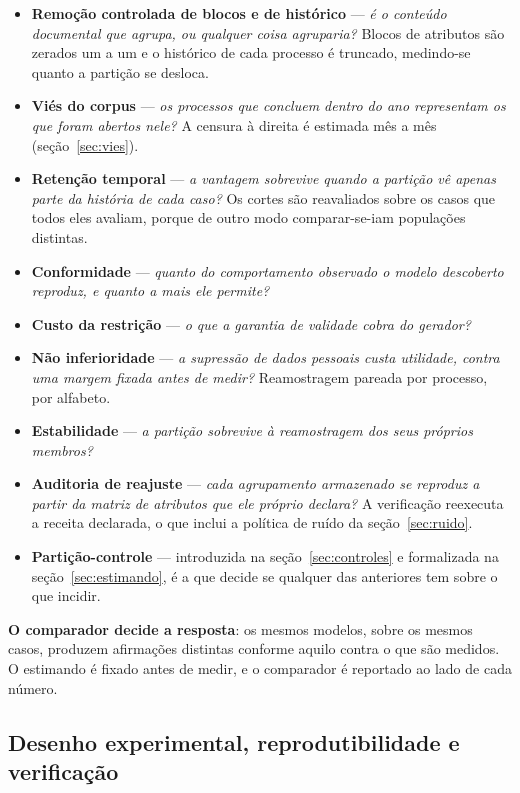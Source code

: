 \begin{itemize}
  \item \textbf{Remoção controlada de blocos e de histórico} --- \emph{é o conteúdo documental que agrupa, ou
    qualquer coisa agruparia?} Blocos de atributos são zerados um a um e o histórico de cada
    processo é truncado, medindo-se quanto a partição se desloca.
  \item \textbf{Viés do corpus} --- \emph{os processos que concluem dentro do ano representam os
    que foram abertos nele?} A censura à direita é estimada mês a mês (seção~\ref{sec:vies}).
  \item \textbf{Retenção temporal} --- \emph{a vantagem sobrevive quando a partição vê apenas parte
    da história de cada caso?} Os cortes são reavaliados sobre os casos que todos eles avaliam,
    porque de outro modo comparar-se-iam populações distintas.
  \item \textbf{Conformidade} --- \emph{quanto do comportamento observado o modelo descoberto
    reproduz, e quanto a mais ele permite?}
  \item \textbf{Custo da restrição} --- \emph{o que a garantia de validade cobra do gerador?}
  \item \textbf{Não inferioridade} --- \emph{a supressão de dados pessoais custa utilidade, contra
    uma margem fixada antes de medir?} Reamostragem pareada por processo, por alfabeto.
  \item \textbf{Estabilidade} --- \emph{a partição sobrevive à reamostragem dos seus próprios
    membros?}
  \item \textbf{Auditoria de reajuste} --- \emph{cada agrupamento armazenado se reproduz a partir da
    matriz de atributos que ele próprio declara?} A verificação reexecuta a receita declarada, o que
    inclui a política de ruído da seção~\ref{sec:ruido}.
  \item \textbf{Partição-controle} --- introduzida na seção~\ref{sec:controles} e formalizada na
    seção~\ref{sec:estimando}, é a que decide se qualquer das anteriores tem sobre o que incidir.
\end{itemize}

\textbf{O comparador decide a resposta}: os mesmos modelos, sobre os mesmos casos, produzem
afirmações distintas conforme aquilo contra o que são medidos. O estimando é fixado antes de medir,
e o comparador é reportado ao lado de cada número.

\subsection{Desenho experimental, reprodutibilidade e verificação}\label{sec:desenho}

